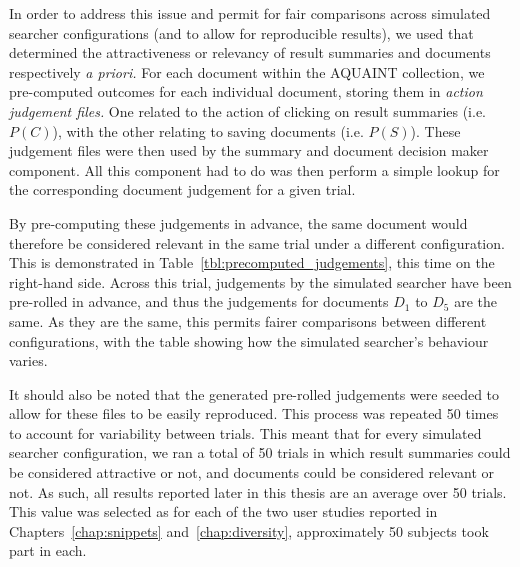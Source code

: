 In order to address this issue and permit for fair comparisons across simulated searcher configurations (and to allow for reproducible results), we used  that determined the attractiveness or relevancy of result summaries and documents respectively \emph{a priori.} For each document within the AQUAINT collection, we pre-computed outcomes for each individual document, storing them in \emph{action judgement files.} One related to the action of clicking on result summaries (i.e. $P(C)$), with the other relating to saving documents (i.e. $P(S)$). These judgement files were then used by the summary and document decision maker component. All this component had to do was then perform a simple lookup for the corresponding document judgement for a given trial.

By pre-computing these judgements in advance, the same document would therefore be considered relevant in the same trial under a different configuration. This is demonstrated in Table~\ref{tbl:precomputed_judgements}, this time on the right-hand side. Across this trial, judgements by the simulated searcher have been pre-rolled in advance, and thus the judgements for documents $D_1$ to $D_5$ are the same. As they are the same, this permits fairer comparisons between different configurations, with the table showing how the simulated searcher's behaviour varies.

It should also be noted that the generated pre-rolled judgements were seeded to allow for these files to be easily reproduced. This process was repeated 50 times to account for variability between trials. This meant that for every simulated searcher configuration, we ran a total of 50 trials in which result summaries could be considered attractive or not, and documents could be considered relevant or not. As such, all results reported later in this thesis are an average over 50 trials. This value was selected as for each of the two user studies reported in Chapters~\ref{chap:snippets} and~\ref{chap:diversity}, approximately 50 subjects took part in each.

